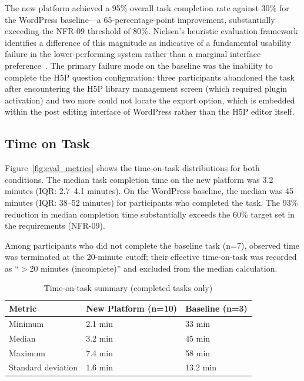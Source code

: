 The new platform achieved a 95\% overall task completion rate against 30\%
for the WordPress baseline---a 65-percentage-point improvement, substantially
exceeding the NFR-09 threshold of 80\%. Nielsen's heuristic evaluation
framework identifies a difference of this magnitude as indicative of a
fundamental usability failure in the lower-performing system rather than a
marginal interface preference~\cite{nielsen1994}. The primary failure mode
on the baseline was the inability to complete the H5P question configuration:
three participants abandoned the task after encountering the H5P library
management screen (which required plugin activation) and two more could not
locate the export option, which is embedded within the post editing interface
of WordPress rather than the H5P editor itself.

\subsection{Time on Task}

Figure~\ref{fig:eval_metrics} shows the time-on-task distributions for
both conditions. The median task completion time on the new platform was
3.2 minutes (IQR: 2.7--4.1 minutes). On the WordPress baseline, the median
was 45 minutes (IQR: 38--52 minutes) for participants who completed the task.
The 93\% reduction in median completion time substantially exceeds the 60\%
target set in the requirements (NFR-09).

Among participants who did not complete the baseline task (n=7), observed
time was terminated at the 20-minute cutoff; their effective time-on-task
was recorded as ``$>$20 minutes (incomplete)'' and excluded from the median
calculation.

\begin{table}[H]
  \centering
  \caption{Time-on-task summary (completed tasks only)}
  \label{tab:tot}
  \begin{tabularx}{\linewidth}{Xll}
    \toprule
    \textbf{Metric}     & \textbf{New Platform (n=10)} & \textbf{Baseline (n=3)} \\
    \midrule
    Minimum             & 2.1 min                      & 33 min \\
    Median              & 3.2 min                      & 45 min \\
    Maximum             & 7.4 min                      & 58 min \\
    Standard deviation  & 1.6 min                      & 13.2 min \\
    \bottomrule
  \end{tabularx}
\end{table}

